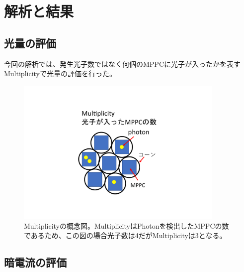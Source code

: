\section{解析と結果}

\subsection{光量の評価}
今回の解析では、発生光子数ではなく何個のMPPCに光子が入ったかを表すMultiplicityで光量の評価を行った。

\begin{figure}[htbp]
  \centering
  \includegraphics[width=10cm]{images/chapter3/Multiplicity.pdf}
  \caption{Multiplicityの概念図。MultiplicityはPhotonを検出したMPPCの数であるため、この図の場合光子数は4だがMultiplicityは3となる。}
  \label{fig:Multiplicity}
\end{figure}

\subsection{暗電流の評価}